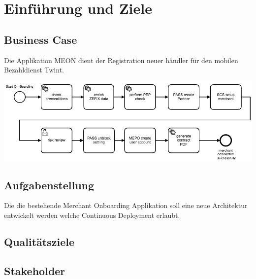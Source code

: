 \graphicspath{{./images/}}

\chapter{Einführung und Ziele}

\section{Business Case}

Die Applikation MEON dient der Registration neuer händler für den mobilen Bezahldienst Twint. 

\begin{center}
	\includegraphics[scale=0.55]{meon-workflow.png}
\end{center}


\section{Aufgabenstellung}

Die die bestehende Merchant Onboarding Applikation soll eine neue Architektur entwickelt werden welche Continuous Deployment erlaubt.

\section{Qualitätsziele}

\section{Stakeholder}


